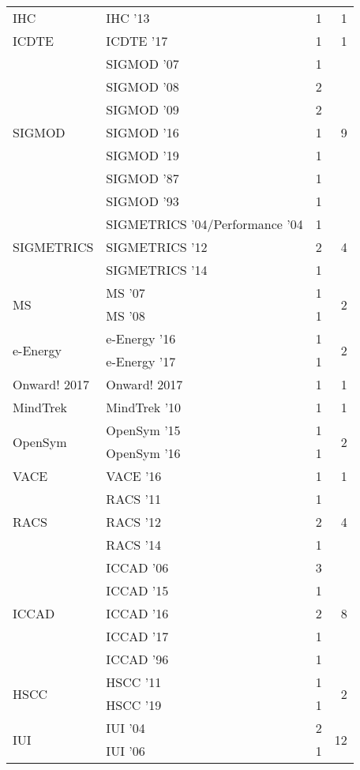 \begin{table*}[t]
\begin{tabular}{llrr}
\multirow{1}{*}{IHC } & IHC '13 & 1 & \multirow{1}{*}{1}\\
\multirow{1}{*}{ICDTE } & ICDTE '17 & 1 & \multirow{1}{*}{1}\\
\multirow{7}{*}{SIGMOD } & SIGMOD '07 & 1 & \multirow{7}{*}{9}\\
& SIGMOD '08 & 2 &\\
& SIGMOD '09 & 2 &\\
& SIGMOD '16 & 1 &\\
& SIGMOD '19 & 1 &\\
& SIGMOD '87 & 1 &\\
& SIGMOD '93 & 1 &\\
\multirow{3}{*}{SIGMETRICS } & SIGMETRICS '04/Performance '04 & 1 & \multirow{3}{*}{4}\\
& SIGMETRICS '12 & 2 &\\
& SIGMETRICS '14 & 1 &\\
\multirow{2}{*}{MS } & MS '07 & 1 & \multirow{2}{*}{2}\\
& MS '08 & 1 &\\
\multirow{2}{*}{e-Energy } & e-Energy '16 & 1 & \multirow{2}{*}{2}\\
& e-Energy '17 & 1 &\\
\multirow{1}{*}{Onward! 2017} & Onward! 2017 & 1 & \multirow{1}{*}{1}\\
\multirow{1}{*}{MindTrek } & MindTrek '10 & 1 & \multirow{1}{*}{1}\\
\multirow{2}{*}{OpenSym } & OpenSym '15 & 1 & \multirow{2}{*}{2}\\
& OpenSym '16 & 1 &\\
\multirow{1}{*}{VACE } & VACE '16 & 1 & \multirow{1}{*}{1}\\
\multirow{3}{*}{RACS } & RACS '11 & 1 & \multirow{3}{*}{4}\\
& RACS '12 & 2 &\\
& RACS '14 & 1 &\\
\multirow{5}{*}{ICCAD } & ICCAD '06 & 3 & \multirow{5}{*}{8}\\
& ICCAD '15 & 1 &\\
& ICCAD '16 & 2 &\\
& ICCAD '17 & 1 &\\
& ICCAD '96 & 1 &\\
\multirow{2}{*}{HSCC } & HSCC '11 & 1 & \multirow{2}{*}{2}\\
& HSCC '19 & 1 &\\
\multirow{9}{*}{IUI } & IUI '04 & 2 & \multirow{9}{*}{12}\\
& IUI '06 & 1 &\\

\end{tabular}
\end{table*}

